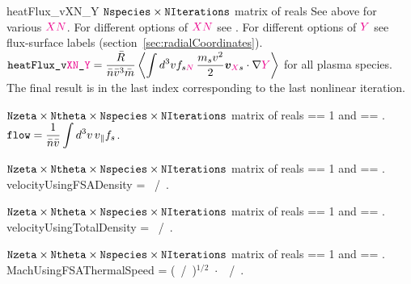 {heatFlux_vXN_Y}
{$\text{\ttfamily Nspecies} \times \text{\ttfamily NIterations}$ matrix of reals}
{See above for various $\textcolor{magenta}{XN}$.}
{For different options of $\textcolor{magenta}{XN}$ see  
.
For different options of $\textcolor{magenta}{Y}$ see flux-surface labels (section~\ref{sec:radialCoordinates}). 
$\displaystyle \text{\ttfamily heatFlux\_v\textcolor{magenta}{XN}\_\textcolor{magenta}{Y}} = \frac{\bar{R}}{\bar{n} \bar{v}^3 \bar{m}} \left\langle \int d^3v f_{s\textcolor{magenta}{N}} \, \frac{m_s v^2}{2} \bm{v}_{\textcolor{magenta}{X}s} \cdot \nabla \textcolor{magenta}{Y}\right\rangle$ for all plasma species. The final result is in the last index corresponding to the last nonlinear iteration.}

\myhrule

{$\text{\ttfamily Nzeta} \times \text{\ttfamily Ntheta} \times \text{\ttfamily Nspecies} \times \text{\ttfamily NIterations}$ matrix of reals}
{ == 1 and  == \true.}
{$\displaystyle \text{\ttfamily flow} =  \frac{1}{\bar{n} \bar{v}} \int d^3v \, v_{\|} f_s$.}

\myhrule

{$\text{\ttfamily Nzeta} \times \text{\ttfamily Ntheta} \times \text{\ttfamily Nspecies} \times \text{\ttfamily NIterations}$ matrix of reals}
{ == 1 and  == \true.}
{{\ttfamily velocityUsingFSADensity} =  ~/~.}

\myhrule

{$\text{\ttfamily Nzeta} \times \text{\ttfamily Ntheta} \times \text{\ttfamily Nspecies} \times \text{\ttfamily NIterations}$ matrix of reals}
{ == 1 and  == \true.}
{{\ttfamily velocityUsingTotalDensity} =  ~/~.}

\myhrule

{$\text{\ttfamily Nzeta} \times \text{\ttfamily Ntheta} \times \text{\ttfamily Nspecies} \times \text{\ttfamily NIterations}$ matrix of reals}
{ == 1 and  == \true.}
{{\ttfamily MachUsingFSAThermalSpeed} =  (~/~)${}^{1/2}$~$\cdot$~~/~.}

